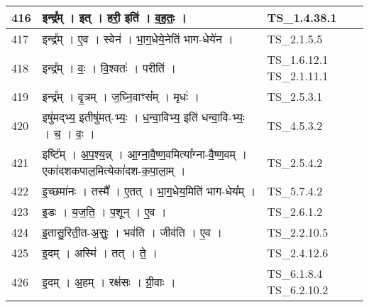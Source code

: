\documentclass[17pt]{extarticle}
\begin{document}
\begin{longtable}{||p{0.4in}||p{4.9in}||p{0.9in}||}
    416 & इन्द्र᳚म्   ।   इत्   ।   हरी॒ इति॑   ।   व॒ह॒तः॒   ।    & TS\_1.4.38.1       \\
    
    \hline
        
    417 & इन्द्र᳚म्   ।   ए॒व   ।   स्वेन॑   ।   भा॒ग॒धेये॒नेति॑ भाग{-}धेये॑न   ।    & TS\_2.1.5.5       \\
    
    \hline
        
    418 & इन्द्र᳚म्   ।   वः॒   ।   वि॒श्वतः॑   ।   परीति॑   ।    & TS\_1.6.12.1 TS\_2.1.11.1       \\
    
    \hline
        
    419 & इन्द्र᳚म्   ।   वृ॒त्रम्   ।   ज॒घ्नि॒वाꣳस᳚म्   ।   मृधः॑   ।    & TS\_2.5.3.1       \\
    
    \hline
        
    420 & इषु॑मद्भ्य॒ इतीषु॑मत्{-}भ्यः॒   ।   ध॒न्वा॒विभ्य॒ इति॑ धन्वा॒वि{-}भ्यः॒   ।   च॒   ।   वः॒   ।    & TS\_4.5.3.2       \\
    
    \hline
        
    421 & इष्टि᳚म्   ।   अ॒प॒श्य॒न्न्   ।   आ॒ग्ना॒वै॒ष्ण॒वमित्या᳚ग्ना{-}वै॒ष्ण॒वम्   ।   एका॑दशकपाल॒मित्येका॑दश{-}क॒पा॒ला॒म्   ।    & TS\_2.5.4.2       \\
    
    \hline
        
    422 & इ॒च्छमा॑नः   ।   तस्मै᳚   ।   ए॒तत्   ।   भा॒ग॒धेय॒मिति॑ भाग{-}धेय᳚म्   ।    & TS\_5.7.4.2       \\
    
    \hline
        
    423 & इ॒डः   ।   य॒ज॒ति॒   ।   प॒शून्   ।   ए॒व   ।    & TS\_2.6.1.2       \\
    
    \hline
        
    424 & इ॒तासु॒रिती॒त{-}अ॒सुः॒   ।   भव॑ति   ।   जीव॑ति   ।   ए॒व   ।    & TS\_2.2.10.5       \\
    
    \hline
        
    425 & इ॒दम्   ।   अस्मि॑   ।   तत्   ।   ते॒   ।    & TS\_2.4.12.6       \\
    
    \hline
        
    426 & इ॒दम्   ।   अ॒हम्   ।   रक्ष॑सः   ।   ग्री॒वाः   ।    & TS\_6.1.8.4 TS\_6.2.10.2       \\
    

\end{longtable}
\end{document}
